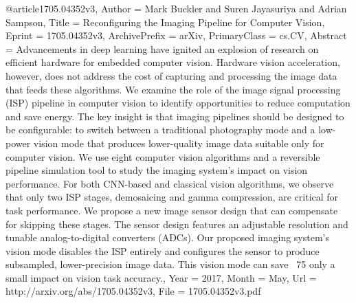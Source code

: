 @article{1705.04352v3,
Author        = {Mark Buckler and Suren Jayasuriya and Adrian Sampson},
Title         = {Reconfiguring the Imaging Pipeline for Computer Vision},
Eprint        = {1705.04352v3},
ArchivePrefix = {arXiv},
PrimaryClass  = {cs.CV},
Abstract      = {Advancements in deep learning have ignited an explosion of research on
efficient hardware for embedded computer vision. Hardware vision acceleration,
however, does not address the cost of capturing and processing the image data
that feeds these algorithms. We examine the role of the image signal processing
(ISP) pipeline in computer vision to identify opportunities to reduce
computation and save energy. The key insight is that imaging pipelines should
be designed to be configurable: to switch between a traditional photography
mode and a low-power vision mode that produces lower-quality image data
suitable only for computer vision. We use eight computer vision algorithms and
a reversible pipeline simulation tool to study the imaging system's impact on
vision performance. For both CNN-based and classical vision algorithms, we
observe that only two ISP stages, demosaicing and gamma compression, are
critical for task performance. We propose a new image sensor design that can
compensate for skipping these stages. The sensor design features an adjustable
resolution and tunable analog-to-digital converters (ADCs). Our proposed
imaging system's vision mode disables the ISP entirely and configures the
sensor to produce subsampled, lower-precision image data. This vision mode can
save ~75%
only a small impact on vision task accuracy.},
Year          = {2017},
Month         = {May},
Url           = {http://arxiv.org/abs/1705.04352v3},
File          = {1705.04352v3.pdf}
}
